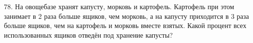 78. На овощебазе хранят капусту, морковь и картофель. Картофель при этом занимает в 2 раза больше ящиков, чем морковь, а на капусту приходится в 3 раза больше ящиков, чем на картофель и морковь вместе взятых. Какой процент всех использованных ящиков отведён под хранение капусты?\\
